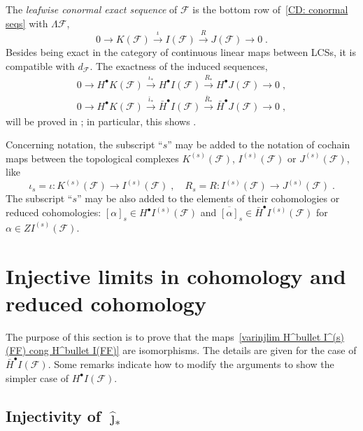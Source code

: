 \documentclass{memo-l}
\theoremstyle{plain}
\theoremstyle{definition}
\theoremstyle{remark}
\newcommand{\FF}{\mathcal{F}}
\numberwithin{section}{chapter}
\numberwithin{equation}{section}%
\begin{document}
The \emph{leafwise conormal exact sequence} of $\FF$ is the bottom row of~\eqref{CD: conormal seqs} with $\Lambda\FF$, 
\begin{equation}\label{leafwise conormal exact seq}
0\to K(\FF) \xrightarrow{\iota} I(\FF) \xrightarrow{R} J(\FF)\to0\;.
\end{equation}
Besides being exact in the category of continuous linear maps between LCSs, it is compatible with $d_\FF$. The exactness of the induced sequences,
\begin{gather}
0\to H^\bullet K(\FF) \xrightarrow{\iota_*} H^\bullet I(\FF) \xrightarrow{R_*} H^\bullet J(\FF)\to0\;,
\label{exact seq in cohom - conormal}\\
0\to H^\bullet K(\FF) \xrightarrow{\bar\iota_*} \bar H^\bullet I(\FF) \xrightarrow{\bar R_*} \bar H^\bullet J(\FF)\to0\;,
\label{exact seq in reduced cohom - conormal}
\end{gather}
will be proved in ; in particular, this shows .

Concerning notation, the subscript ``$s$'' may be added to the notation of cochain maps between the topological complexes $K^{(s)}(\FF)$, $I^{(s)}(\FF)$ or $J^{(s)}(\FF)$, like  
\begin{equation}\label{iota_s}
\iota_s=\iota:K^{(s)}(\FF)\to I^{(s)}(\FF)\;,\quad R_s=R:I^{(s)}(\FF)\to J^{(s)}(\FF)\;.
\end{equation}
The subscript ``$s$'' may be also added to the elements of their cohomologies or reduced cohomologies: $[\alpha]_s\in H^\bullet I^{(s)}(\FF)$  and $\overline{[\alpha]}_s\in\bar H^\bullet I^{(s)}(\FF)$  for $\alpha\in ZI^{(s)}(\FF)$.



\section{Injective limits in cohomology and reduced cohomology}\label{s: injj lims in cohom and reduced cohom}

The purpose of this section is to prove that the maps~\eqref{varinjlim H^bullet I^(s)(FF) cong H^bullet I(FF)} are isomorphisms. The details are given for the case of $\bar H^\bullet I(\FF)$. Some remarks indicate how to modify the arguments to show the simpler case of $H^\bullet I(\FF)$. 


\subsection{Injectivity of $\hat\jmath_*$}\label{ss: injectivity of hat jmath_*}
\end{document}
